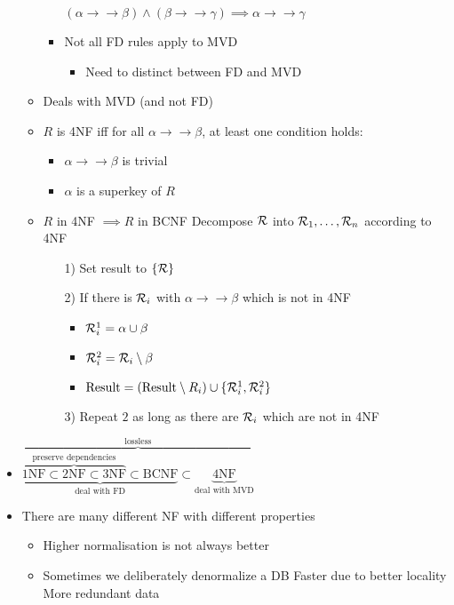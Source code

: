 \begin{itemize}
\begin{itemize}
\begin{itemize}
                     $(\alpha \to \to \beta) \wedge (\beta \to \to \gamma) \implies \alpha \to \to \gamma$
                    \item Not all FD rules apply to MVD
                        \begin{itemize}
                            \item Need to distinct between FD and MVD
                        \end{itemize}
                \end{itemize}
            \item Deals with MVD (and not FD)
            \item $R$ is 4NF iff for all $\alpha \to \to \beta$, at least one condition holds:
                \begin{itemize}
                    \item $\alpha \to \to \beta$ is trivial
                    \item $\alpha$ is a superkey of $R$
                \end{itemize}
            \item $R$ in 4NF $\implies R$ in BCNF
             Decompose $\mathcal{R}$ into $\mathcal{R}_1, \dots, \mathcal{R}_n$ according to 4NF
                \begin{itemize}
                    \item[1)] Set result to $\{\mathcal{R}\}$
                    \item[2)] If there is $\mathcal{R}_i$ with $\alpha \to\to \beta$ which is not in 4NF
                        \begin{itemize}
                            \item $\mathcal{R}^1_i = \alpha \cup \beta$
                            \item $\mathcal{R}^2_i = \mathcal{R}_i \setminus \beta$
                            \item $\text{Result} = (\text{Result} \setminus R_i) \cup \{\mathcal{R}^1_i, \mathcal{R}^2_i\}$
                        \end{itemize}
                    \item[3)] Repeat $2$ as long as there are $\mathcal{R}_i$ which are not in 4NF
                \end{itemize}
        \end{itemize}
    \item $\overbrace{\underbrace{\overbrace{\text{1NF} \subset \text{2NF} \subset \text{3NF}}^{\text{preserve dependencies}} \subset \text{BCNF}}_{\text{deal with FD}} \subset \underbrace{\text{4NF}}_{\text{deal with MVD}}}^{\text{lossless}}$
    \item There are many different NF with different properties
        \begin{itemize}
            \item Higher normalisation is not always better
            \item Sometimes we deliberately denormalize a DB
            \ipro Faster due to better locality
            \icon More redundant data
        \end{itemize}
\end{itemize}
